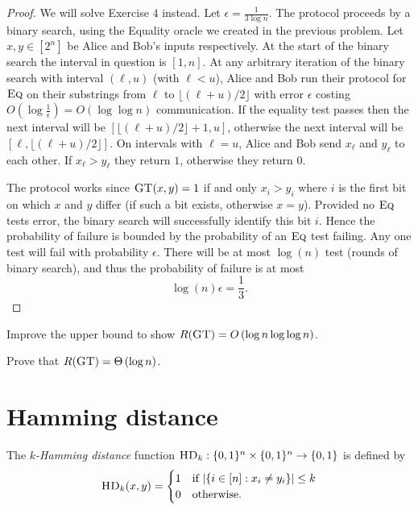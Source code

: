 \begin{proof}
We will solve Exercise $4$ instead. Let $\epsilon = \frac{1}{3\log n}$. The protocol proceeds by a binary search, using the Equality oracle we created in the previous problem. Let $x, y \in [2^n]$ be Alice and Bob's inputs respectively. At the start of the binary search the interval in question is $[1,n]$. At any arbitrary iteration of the binary search with interval $(\ell, u)$ (with $\ell < u$), Alice and Bob run their protocol for $\textsc{Eq}$ on their substrings from $\ell$ to $\lfloor (\ell+u)/2 \rfloor$ with error $\epsilon$ costing $O(\log \frac{1}{\epsilon}) = O(\log\log n)$ communication. If the equality test passes then the next interval will be $[\lfloor (\ell+u)/2 \rfloor + 1, u]$, otherwise the next interval will be $[\ell, \lfloor (\ell+u)/2 \rfloor]$. On intervals with $\ell = u$, Alice and Bob send $x_\ell$ and $y_\ell$ to each other. If $x_\ell > y_\ell$ they return $1$, otherwise they return $0$.

The protocol works since $\textsc{GT}(x,y) = 1$ if and only $x_i > y_i$ where $i$ is the first bit on which $x$ and $y$ differ (if such a bit exists, otherwise $x=y$). Provided no $\textsc{Eq}$ tests error, the binary search will successfully identify this bit $i$. Hence the probability of failure is bounded by the probability of an $\textsc{Eq}$ test failing. Any one test will fail with probability $\epsilon$. There will be at most $\log(n)$ test (rounds of binary search), and thus the probability of failure is at most
$$\log(n) \epsilon = \frac{1}{3}.$$
\end{proof}

\exercises

\begin{exercise}
Improve the upper bound to show $R(\textsc{GT}) = O\left(\log n \log \log n \right)$.
\end{exercise}

\begin{exercise}
Prove that $R(\textsc{GT}) = \Theta\left(\log n \right)$.
\end{exercise}


\newpage 
\section{Hamming distance}

The \emph{$k$-Hamming distance} function $\textsc{HD}_k : \{0,1\}^n \times \{0,1\}^n \to \{0,1\}$ is defined by
\[
\textsc{HD}_k(x,y) = \begin{cases}
1 & \mbox{if } |\{i \in [n] : x_i \neq y_i\}| \le k \\
0 & \mbox{otherwise.}
\end{cases}
\]

